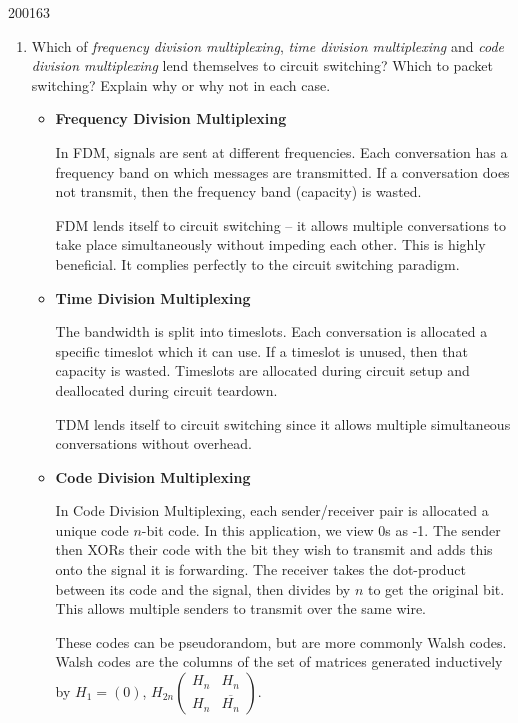 \documentclass[10pt,\jkfside,a4paper]{article}
\begin{document}
\begin{examquestion}{2001}{6}{3}
\begin{enumerate}
\item Which of \textit{frequency division multiplexing}, \textit{time
division multiplexing} and \textit{code division multiplexing} lend
themselves to circuit switching? Which to packet switching? Explain why or
why not in each case.

\begin{itemize}

\item

\textbf{Frequency Division Multiplexing}

In FDM, signals are sent at different frequencies. Each conversation has a
frequency band on which messages are transmitted. If a conversation does not
transmit, then the frequency band (capacity) is wasted.

FDM lends itself to circuit switching -- it allows multiple conversations to
take place simultaneously without impeding each other. This is highly
beneficial. It complies perfectly to the circuit switching paradigm.

\item

\textbf{Time Division Multiplexing}

The bandwidth is split into timeslots. Each conversation is allocated a
specific timeslot which it can use. If a timeslot is unused, then that
capacity is wasted. Timeslots are allocated during circuit setup and
deallocated during circuit teardown.

TDM lends itself to circuit switching since it allows multiple
simultaneous conversations without overhead.

\item

\textbf{Code Division Multiplexing}

In Code Division Multiplexing, each sender/receiver pair is allocated a
unique code $n$-bit code. In this application, we view 0s as -1. The sender
then XORs their code with the bit they wish to transmit and adds this onto
the signal it is forwarding. The receiver takes the dot-product between its
code and the signal, then divides by $n$ to get the original bit. This
allows multiple senders to transmit over the same wire.

These codes can be pseudorandom, but are more commonly Walsh codes. Walsh
codes are the columns of the set of matrices generated inductively by
$H_1 = (0)$, $H_{2n} \begin{pmatrix}H_n & H_n \\ H_n & \overline{H_n} \end{pmatrix}$.


\end{itemize}
\end{enumerate}
\end{examquestion}
\end{document}

